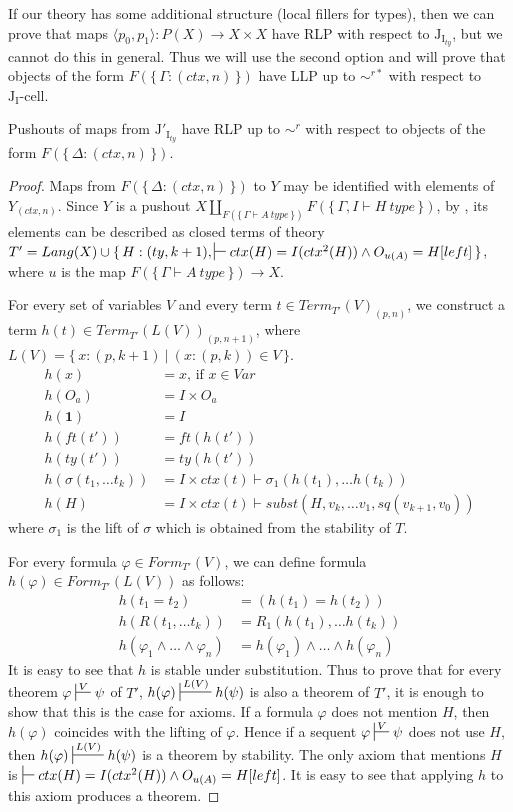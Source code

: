 \documentclass[reqno]{amsart}
\theoremstyle{definition}
\theoremstyle{remark}
\newcommand{\emptyCtx}{\mathbf{1}}
\newcommand{\I}{\mathrm{I}}
\newcommand{\J}{\mathrm{J}}
\newcommand{\class}[2]{#1\text{-}\mathrm{#2}}
\newcommand{\Icell}[1][\I]{\class{#1}{cell}}
\newcommand{\Jcell}[1][]{\Icell[\J#1]}
\numberwithin{figure}{section}
\begin{document}
If our theory has some additional structure (local fillers for types),
then we can prove that maps $\langle p_0, p_1 \rangle : P(X) \to X \times X$ have RLP with respect to $\J_{\I_{ty}}$,
but we cannot do this in general.
Thus we will use the second option and will prove that objects of the form $F(\{\,\Gamma : (ctx,n)\,\})$ have LLP up to $\sim^{r*}$ with respect to $\Jcell[_\I]$.

\begin{lem}[Jty]
Pushouts of maps from $\J'_{\I_{ty}}$ have RLP up to $\sim^r$ with respect to objects of the form $F(\{\,\Delta : (ctx,n)\,\})$.
\end{lem}
\begin{proof}
Maps from $F(\{\,\Delta : (ctx,n)\,\})$ to $Y$ may be identified with elements of $Y_{(ctx,n)}$.
Since $Y$ is a pushout $X \amalg_{F(\{\,\Gamma \vdash A\ type\,\})} F(\{\,\Gamma, I \vdash H\ type\,\})$,
by , its elements can be described as closed terms of theory
$T' = Lang(X) \cup \{\,H : (ty,k+1), \sststile{}{} ctx(H) = I(ctx^2(H)) \land O_{u(A)} = H[left]\,\}$,
where $u$ is the map $F(\{\,\Gamma \vdash A\ type\,\}) \to X$.

For every set of variables $V$ and every term $t \in Term_{T'}(V)_{(p,n)}$,
we construct a term $h(t) \in Term_{T'}(L(V))_{(p,n+1)}$, where $L(V) = \{\,x : (p,k+1)\ |\ (x : (p,k)) \in V\,\}$.
\begin{align*}
h(x) & = x \text{, if } x \in Var \\
h(O_a) & = I \times O_a \\
h(\emptyCtx) & = I \\
h(ft(t')) & = ft(h(t')) \\
h(ty(t')) & = ty(h(t')) \\
h(\sigma(t_1, \ldots t_k)) & = I \times ctx(t) \vdash \sigma_1(h(t_1), \ldots h(t_k)) \\
h(H) & = I \times ctx(t) \vdash subst(H, v_k, \ldots v_1, sq(v_{k+1}, v_0))
\end{align*}
where $\sigma_1$ is the lift of $\sigma$ which is obtained from the stability of $T$.

For every formula $\varphi \in Form_{T'}(V)$, we can define formula $h(\varphi) \in Form_{T'}(L(V))$ as follows:
\begin{align*}
h(t_1 = t_2) & = (h(t_1) = h(t_2)) \\
h(R(t_1, \ldots t_k)) & = R_1(h(t_1), \ldots h(t_k)) \\
h(\varphi_1 \land \ldots \land \varphi_n) & = h(\varphi_1) \land \ldots \land h(\varphi_n)
\end{align*}
It is easy to see that $h$ is stable under substitution.
Thus to prove that for every theorem $\varphi \sststile{}{V} \psi$ of $T'$, $h(\varphi) \sststile{}{L(V)} h(\psi)$
is also a theorem of $T'$, it is enough to show that this is the case for axioms.
If a formula $\varphi$ does not mention $H$, then $h(\varphi)$ coincides with the lifting of $\varphi$.
Hence if a sequent $\varphi \sststile{}{V} \psi$ does not use $H$, then $h(\varphi) \sststile{}{L(V)} h(\psi)$ is a theorem by stability.
The only axiom that mentions $H$ is $\sststile{}{} ctx(H) = I(ctx^2(H)) \land O_{u(A)} = H[left]$.
It is easy to see that applying $h$ to this axiom produces a theorem.


\end{proof}
\end{document}
